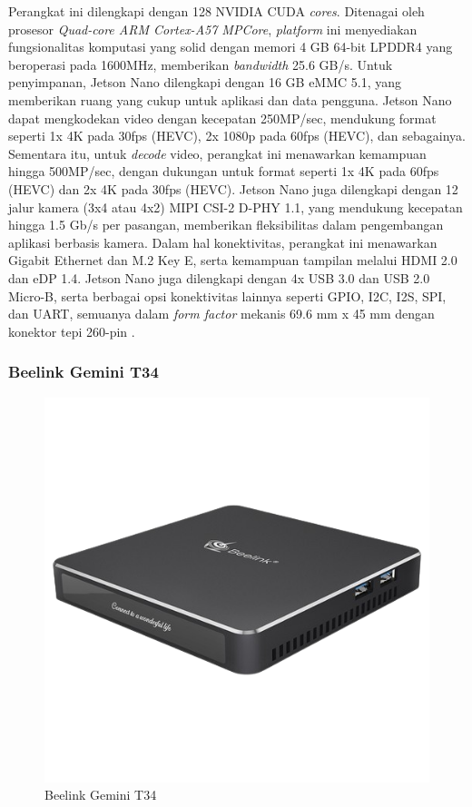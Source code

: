 Perangkat ini dilengkapi dengan 128 NVIDIA CUDA \emph{cores}. Ditenagai oleh prosesor \emph{Quad-core ARM Cortex-A57 MPCore}, \emph{platform} ini menyediakan fungsionalitas komputasi yang solid dengan memori 4 GB 64-bit LPDDR4 yang beroperasi pada 1600MHz, memberikan \emph{bandwidth} 25.6 GB/s. Untuk penyimpanan, Jetson Nano dilengkapi dengan 16 GB eMMC 5.1, yang memberikan ruang yang cukup untuk aplikasi dan data pengguna. Jetson Nano dapat mengkodekan video dengan kecepatan 250MP/sec, mendukung format seperti 1x 4K pada 30fps (HEVC), 2x 1080p pada 60fps (HEVC), dan sebagainya. Sementara itu, untuk \emph{decode} video, perangkat ini menawarkan kemampuan hingga 500MP/sec, dengan dukungan untuk format seperti 1x 4K pada 60fps (HEVC) dan 2x 4K pada 30fps (HEVC). Jetson Nano juga dilengkapi dengan 12 jalur kamera (3x4 atau 4x2) MIPI CSI-2 D-PHY 1.1, yang mendukung kecepatan hingga 1.5 Gb/s per pasangan, memberikan fleksibilitas dalam pengembangan aplikasi berbasis kamera. Dalam hal konektivitas, perangkat ini menawarkan Gigabit Ethernet dan M.2 Key E, serta kemampuan tampilan melalui HDMI 2.0 dan eDP 1.4. Jetson Nano juga dilengkapi dengan 4x USB 3.0 dan USB 2.0 Micro-B, serta berbagai opsi konektivitas lainnya seperti GPIO, I2C, I2S, SPI, dan UART, semuanya dalam \emph{form factor} mekanis 69.6 mm x 45 mm dengan konektor tepi 260-pin \parencite{nvidiaJetsonNano}.

\subsubsection{Beelink Gemini T34}
 \begin{figure}[htbp]
     \centering
     \includegraphics[scale=0.5]{gambar/bab2-beelink-gemini-t34.png}
     \caption{Beelink Gemini T34}
     \label{fig:beelinkgeminit34}
\end{figure}

